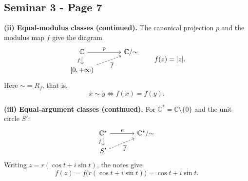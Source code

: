 
\subsection*{Seminar 3 - Page 7}
\begingroup
\setlength{\abovedisplayskip}{5pt}
\setlength{\belowdisplayskip}{5pt}
\setlength{\abovedisplayshortskip}{3pt}
\setlength{\belowdisplayshortskip}{3pt}

\noindent\textbf{(ii) Equal-modulus classes (continued).}
The canonical projection $p$ and the modulus map $f$ give the diagram
\[
\begin{tikzcd}[column sep=large,row sep=small]
 \mathbb C\arrow[r,"p"]\arrow[d,"f"'] & \mathbb C/{\sim}\\
 {[0,+\infty)}\arrow[ur,dashed,"\overline f"'] &
\end{tikzcd}
\qquad f(z)=|z|.
\]
Here $\sim=R_f$, that is,
\[
 x\sim y\iff f(x)=f(y).
\]

\noindent\textbf{(iii) Equal-argument classes (continued).}
For $\mathbb C^*=\mathbb C\setminus\{0\}$ and the unit circle $S'$:
\[
\begin{tikzcd}[column sep=large,row sep=small]
 \mathbb C^*\arrow[r,"p"]\arrow[d,"f"'] & \mathbb C^*/{\sim}\\
 S'\arrow[ur,dashed,"\overline f"'] &
\end{tikzcd}
\]
Writing $z=r(\cos t+i\sin t)$, the notes give
\[
 f(z)=f\bigl(r(\cos t+i\sin t)\bigr)=\cos t+i\sin t.
\]


